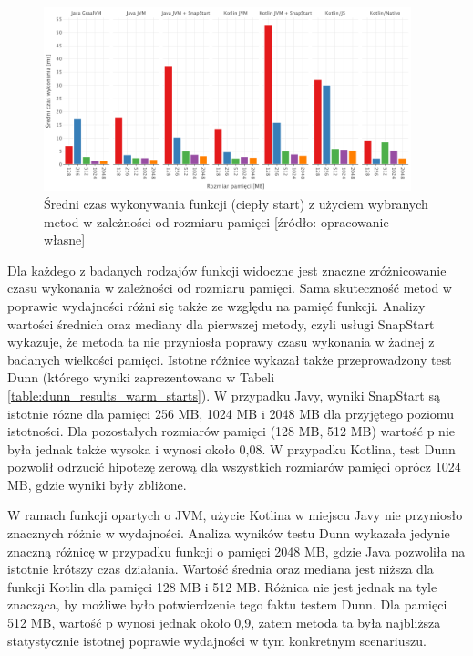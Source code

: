 \begin{figure}[h!]
    \centering
    \includegraphics[width=0.95\textwidth]{charts/results/avg-warm-start.png}
    \caption{Średni czas wykonywania funkcji (ciepły start) z użyciem wybranych metod w zależności od rozmiaru pamięci [źródło: opracowanie własne]}
    \label{fig:avg_warm_start}
\end{figure}

Dla każdego z badanych rodzajów funkcji widoczne jest znaczne zróżnicowanie czasu wykonania w zależności od rozmiaru pamięci.
Sama skuteczność metod w poprawie wydajności różni się także ze względu na pamięć funkcji.
Analizy wartości średnich oraz mediany dla pierwszej metody, czyli usługi SnapStart wykazuje, że metoda ta nie przyniosła poprawy czasu wykonania w żadnej z badanych wielkości pamięci.
Istotne różnice wykazał także przeprowadzony test Dunn (którego wyniki zaprezentowano w Tabeli \ref{table:dunn_results_warm_starts}).
W przypadku Javy, wyniki SnapStart są istotnie różne dla pamięci 256 MB, 1024 MB i 2048 MB dla przyjętego poziomu istotności.
Dla pozostałych rozmiarów pamięci (128 MB, 512 MB) wartość p nie była jednak także wysoka i wynosi około 0,08.
W przypadku Kotlina, test Dunn pozwolił odrzucić hipotezę zerową dla wszystkich rozmiarów pamięci oprócz 1024 MB, gdzie wyniki były zbliżone. 

W ramach funkcji opartych o JVM, użycie Kotlina w miejscu Javy nie przyniosło znacznych różnic w wydajności.
Analiza wyników testu Dunn wykazała jedynie znaczną różnicę w przypadku funkcji o pamięci 2048 MB, gdzie Java pozwoliła na istotnie krótszy czas działania.
Wartość średnia oraz mediana jest niższa dla funkcji Kotlin dla pamięci 128 MB i 512 MB.
Różnica nie jest jednak na tyle znacząca, by możliwe było potwierdzenie tego faktu testem Dunn.
Dla pamięci 512 MB, wartość p wynosi jednak około 0,9, zatem metoda ta była najbliższa statystycznie istotnej poprawie wydajności w tym konkretnym scenariuszu. 

